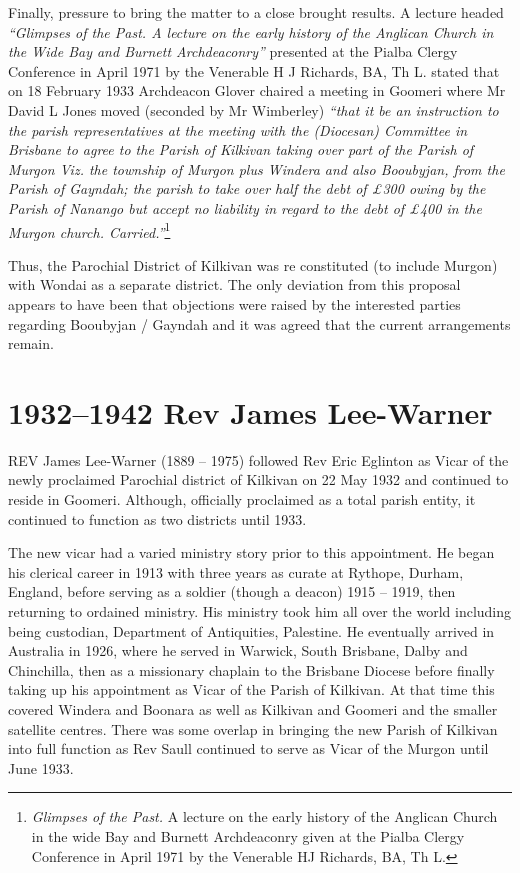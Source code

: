 Finally, pressure to bring the matter to a close brought results. A lecture headed \emph{``Glimpses of the Past. A lecture on the early history of the Anglican Church in the Wide Bay and Burnett Archdeaconry''} presented at the Pialba Clergy Conference in April 1971 by the Venerable H J Richards, BA, Th L. stated that on 18 February 1933 Archdeacon Glover chaired a meeting in Goomeri where Mr David L Jones moved (seconded by Mr Wimberley) \emph{``that it be an instruction to the parish representatives at the meeting with the (Diocesan) Committee in Brisbane to agree to the Parish of Kilkivan taking over part of the Parish of Murgon Viz. the township of Murgon plus Windera and also Booubyjan, from the Parish of Gayndah; the parish to take over half the debt of \pounds300 owing by the Parish of Nanango but accept no liability in regard to the debt of \pounds400 in the Murgon church. Carried.''}\footnote{\emph{Glimpses of the Past.} A lecture on the early history of the Anglican Church in the wide Bay and Burnett Archdeaconry given at the Pialba Clergy Conference in April 1971 by the Venerable HJ Richards, BA, Th L.}


Thus, the Parochial District of Kilkivan was re constituted (to include Murgon) with Wondai as a separate district. The only deviation from this proposal appears to have been that objections were raised by the interested parties regarding Booubyjan / Gayndah and it was agreed that the current arrangements remain.



\balance


\printendnotes[custom]
\setcounter{endnote}{0}
\chapter{1932--1942 Rev James Lee-Warner}
\nobalance


\lettrine[lines=3]{R}{EV}
 James Lee-Warner (1889 -- 1975) followed Rev Eric Eglinton as Vicar of the newly proclaimed Parochial district of Kilkivan on 22 May 1932 and continued to reside in Goomeri. Although, officially proclaimed as a total parish entity, it continued to function as two districts until 1933.

The new vicar had a varied ministry story prior to this appointment. He began his clerical career in 1913 with three years as curate at Rythope, Durham, England, before serving as a soldier (though a deacon) 1915 -- 1919, then returning to ordained ministry. His ministry took him all over the world including being custodian, Department of Antiquities, Palestine. He eventually arrived in Australia in 1926, where he served in Warwick, South Brisbane, Dalby and Chinchilla, then as a missionary chaplain to the Brisbane Diocese before finally taking up his appointment as Vicar of the Parish of Kilkivan. At that time this covered Windera and Boonara as well as Kilkivan and Goomeri and the smaller satellite centres. There was some overlap in bringing the new Parish of Kilkivan into full function as Rev Saull continued to serve as Vicar of the Murgon until June 1933.



